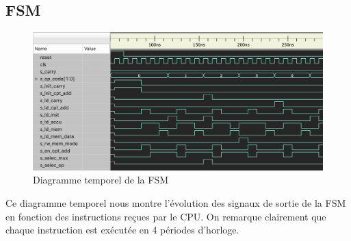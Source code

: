 \documentclass{article}
\begin{document}
    \subsection{FSM}
    \begin{figure}[h]
        \centering
        \includegraphics[width=\textwidth]{../doc/tb_screen/fsm.png}
        \caption{Diagramme temporel de la FSM}
        \label{fig:diag_tb_fsm}
    \end{figure}
    \par Ce diagramme temporel nous montre l'évolution des signaux de sortie de la FSM en fonction des instructions reçues par le CPU. On remarque clairement que chaque instruction est exécutée en 4 périodes d'horloge.

    \newpage
\end{document}
